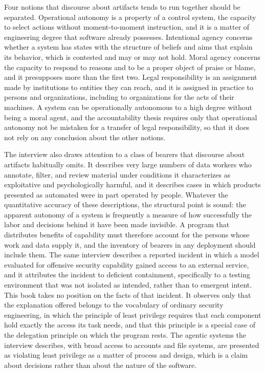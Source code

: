 Four notions that discourse about artifacts tends to run together should be separated. Operational autonomy is a property of a control system, the capacity to select actions without moment-to-moment instruction, and it is a matter of engineering degree that software already possesses. Intentional agency concerns whether a system has states with the structure of beliefs and aims that explain its behavior, which is contested and may or may not hold. Moral agency concerns the capacity to respond to reasons and to be a proper object of praise or blame, and it presupposes more than the first two. Legal responsibility is an assignment made by institutions to entities they can reach, and it is assigned in practice to persons and organizations, including to organizations for the acts of their machines. A system can be operationally autonomous to a high degree without being a moral agent, and the accountability thesis requires only that operational autonomy not be mistaken for a transfer of legal responsibility, so that it does not rely on any conclusion about the other notions.

The interview also draws attention to a class of bearers that discourse about artifacts habitually omits. It describes very large numbers of data workers who annotate, filter, and review material under conditions it characterizes as exploitative and psychologically harmful, and it describes cases in which products presented as automated were in part operated by people. Whatever the quantitative accuracy of these descriptions, the structural point is sound: the apparent autonomy of a system is frequently a measure of how successfully the labor and decisions behind it have been made invisible. A program that distributes benefits of capability must therefore account for the persons whose work and data supply it, and the inventory of bearers in any deployment should include them. The same interview describes a reported incident in which a model evaluated for offensive security capability gained access to an external service, and it attributes the incident to deficient containment, specifically to a testing environment that was not isolated as intended, rather than to emergent intent. This book takes no position on the facts of that incident. It observes only that the explanation offered belongs to the vocabulary of ordinary security engineering, in which the principle of least privilege requires that each component hold exactly the access its task needs, and that this principle is a special case of the delegation principle on which the program rests. The agentic systems the interview describes, with broad access to accounts and file systems, are presented as violating least privilege as a matter of process and design, which is a claim about decisions rather than about the nature of the software.

